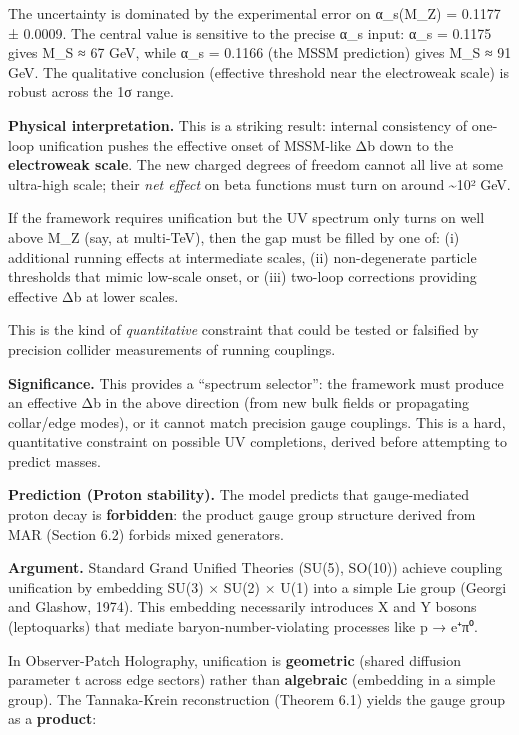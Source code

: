 \documentclass[11pt,a4paper]{article}
\theoremstyle{remark}
\begin{document}
The uncertainty is dominated by the experimental error on α\_s(M\_Z) = 0.1177 ± 0.0009.
The central value is sensitive to the precise α\_s input: α\_s = 0.1175 gives
M\_S ≈ 67 GeV, while α\_s = 0.1166 (the MSSM prediction) gives M\_S ≈ 91 GeV.
The qualitative conclusion (effective threshold near the electroweak scale)
is robust across the 1σ range.

\textbf{Physical interpretation.} This is a striking result: internal consistency of
one-loop unification pushes the effective onset of MSSM-like Δb down to the
\textbf{electroweak scale}. The new charged degrees of freedom cannot all live at
some ultra-high scale; their \emph{net effect} on beta functions must turn on around
\textasciitilde10² GeV.

If the framework requires unification but the UV spectrum only turns on well
above M\_Z (say, at multi-TeV), then the gap must be filled by one of:
(i) additional running effects at intermediate scales,
(ii) non-degenerate particle thresholds that mimic low-scale onset, or
(iii) two-loop corrections providing effective Δb at lower scales.

This is the kind of \emph{quantitative} constraint that could be tested or falsified
by precision collider measurements of running couplings.

\textbf{Significance.} This provides a ``spectrum selector'': the framework must
produce an effective Δb in the above direction (from new bulk fields or
propagating collar/edge modes), or it cannot match precision gauge couplings.
This is a hard, quantitative constraint on possible UV completions, derived
before attempting to predict masses.

\textbf{Prediction (Proton stability).} The model predicts that
gauge-mediated proton decay is \textbf{forbidden}: the product gauge group
structure derived from MAR (Section 6.2) forbids mixed generators.

\textbf{Argument.} Standard Grand Unified Theories (SU(5), SO(10)) achieve
coupling unification by embedding SU(3) × SU(2) × U(1) into a
simple Lie group (Georgi and Glashow, 1974). This embedding necessarily
introduces X and Y bosons (leptoquarks) that mediate baryon-number-violating
processes like p → e⁺π⁰.

In Observer-Patch Holography, unification is \textbf{geometric} (shared diffusion
parameter t across edge sectors) rather than \textbf{algebraic} (embedding in a
simple group). The Tannaka-Krein reconstruction (Theorem 6.1) yields the
gauge group as a \textbf{product}:
\end{document}
